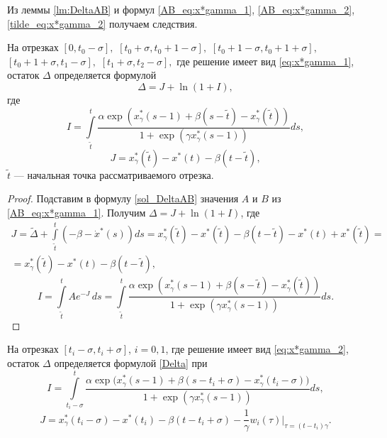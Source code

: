 Из леммы \eqref{lm:DeltaAB} и формул \eqref{AB_eq:x*gamma_1}, \eqref{AB_eq:x*gamma_2}, \eqref{tilde_eq:x*gamma_2} получаем следствия.
\begin{corollary}\label{corol_Delta_long}
На отрезках $[0, t_0-\sigma],$ $[t_0+\sigma, t_0+1-\sigma],$ $[t_0+1-\sigma, t_0+1+\sigma],$ $[t_0+1+\sigma, t_1-\sigma],$ $[t_1+\sigma,t_2-\sigma],$ где решение имеет вид \eqref{eq:x*gamma_1}, остаток $\Delta$ определяется формулой
\begin{equation}
    \label{Delta}
    \Delta = J + \ln(1 + I),
\end{equation}
где 
\begin{equation}
    \label{I_long}
    I = \int\limits_{\tilde{t}}^{t}\frac{\alpha\exp(x_{\gamma}^*(s-1)+\beta(s-\tilde{t})-x_{\gamma}^*(\tilde{t}))}{1 + \exp(\gamma x_{\gamma}^*(s-1))} ds,
\end{equation}
%
\begin{equation}\label{eq:J_long}
    J = x_{\gamma}^*(\tilde{t}) - x^*(t) - \beta(t - \tilde{t}),
\end{equation}
%
$\tilde{t}$ --- начальная точка рассматриваемого отрезка.
\end{corollary}
%
\begin{proof}
	Подставим в формулу \eqref{sol_DeltaAB} значения $A$ и $B$ из \eqref{AB_eq:x*gamma_1}. Получим $\Delta = J + \ln(1 + I)$, где
\begin{multline*}
	J = \tilde{\Delta} + \int\limits_{\tilde{t}}^{t}(-\beta - \dot{x}^*(s))ds = x_{\gamma}^*(\tilde{t}) - x^*(\tilde{t}) - \beta(t - \tilde{t}) - x^*(t) + x^*(\tilde{t}) =\\= x_{\gamma}^*(\tilde{t}) - x^*(t) - \beta(t - \tilde{t}),
\end{multline*}
\[
	I = \int\limits_{\tilde{t}}^{t} A e^{-J} \, ds = \int\limits_{\tilde{t}}^{t}\frac{\alpha\exp(x_{\gamma}^*(s-1)+\beta(s-\tilde{t})-x_{\gamma}^*(\tilde{t}))}{1 + \exp(\gamma x_{\gamma}^*(s-1))} ds.
\]
\end{proof}
%
\begin{corollary}\label{corol_Delta_short}
На отрезках $[t_i-\sigma,t_i+\sigma]$, $i=0, 1$, где решение имеет вид \eqref{eq:x*gamma_2}, остаток $\Delta$ определяется формулой \eqref{Delta} при
 \begin{equation}
    \label{I_point}
   I=\int\limits_{t_i-\sigma}^{t}\frac{\alpha\exp\big(x_{\gamma}^*(s-1)+\beta(s-t_i+\sigma)-x_{\gamma}^*(t_i-\sigma)\big)}{1+\exp(\gamma x_{\gamma}^*(s-1))}ds,
\end{equation}
%
\begin{equation}
    \label{J_point}
    J=x_{\gamma}^*(t_i - \sigma) - x^*(t_i) - \beta(t-t_i+\sigma) - \frac{1}{\gamma} w_i(\tau)|_{\tau=(t-t_i)\gamma}.
\end{equation}
\end{corollary}
